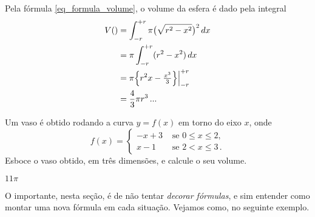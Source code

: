 \begin{ex}
\begin{center}
\begin{bmlimage}
\end{bmlimage}
\end{center}

Pela fórmula 
\eqref{eq_formula_volume}, o volume da esfera é dado pela integral 
\begin{align*}
V(\text)&=\int_{-r}^{+r}\pi\bigl(\sqrt{r^2-x^2}\bigr)^2\,dx\\
&=\pi\int_{-r}^{+r}(r^2-x^2)\,dx\\
&=\pi\Bigl\{r^2x-\tfrac{x^3}{3}\Bigr\}\Big|_{-r}^{+r}\\
&=\frac{4}{3}\pi r^3\,...
\end{align*}

\end{ex}


\begin{exo}
Um vaso \'e obtido rodando a curva $y=f(x)$ em torno do eixo
$x$, onde
$$
f(x)=
\begin{cases}
-x+3&\text{ se }0\leq x\leq 2,\\
x-1&\text{ se }2<x\leq 3\,.
\end{cases}
$$
Esboce o vaso obtido, em três dimensões, e calcule o seu volume.
\begin{sol} $11\pi$
 \end{sol}
\end{exo}

O importante, nesta seção, é de não tentar
\emph{decorar fórmulas}, e sim entender como montar uma nova
fórmula em cada situação. Vejamos como, no seguinte exemplo.

